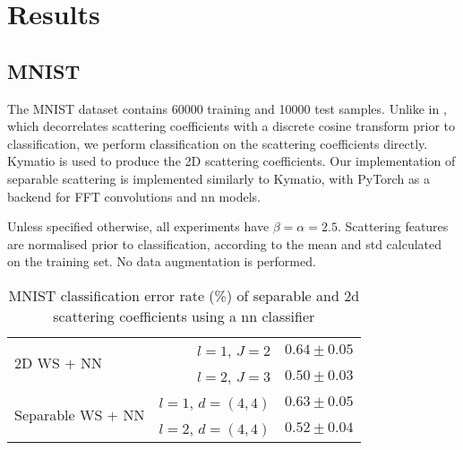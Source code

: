 


\section{Results}



\subsection{MNIST}


The MNIST dataset \citep{mnist} contains 60000 training and 10000 test samples. Unlike in \citep{2dscattering}, which decorrelates scattering coefficients with a discrete cosine transform prior to classification, we perform classification on the scattering coefficients directly. Kymatio \citep{kymatio} is used to produce the 2D scattering coefficients. Our implementation of separable scattering is implemented similarly to Kymatio, with PyTorch \citep{pytorch} as a backend for FFT convolutions and \ac{nn} models.

Unless specified otherwise, all experiments have $\beta = \alpha = 2.5$. Scattering features are normalised prior to classification, according to the mean and \ac{std} calculated on the training set. No data augmentation is performed.

\begin{table}
\centering
\caption{MNIST classification error rate (\%) of separable and \ac{2d} scattering coefficients using a \ac{nn} classifier} \label{tab:mnistnn}
\begin{tabular}{|lr|l|} \hline
\multirow{2}{*}{2D WS + NN}        & $l=1$, $J=2$  & $0.64 \pm 0.05$    \\
          & $l=2$, $J=3$ & $0.50 \pm 0.03$     \\ \hline
\multirow{2}{*}{Separable WS + NN}  & $l=1$, $d=(4,4)$ & $0.63 \pm 0.05 $    \\
          & $l=2$, $d=(4,4)$  & $0.52 \pm 0.04$     \\ \hline
\end{tabular}
\end{table}



